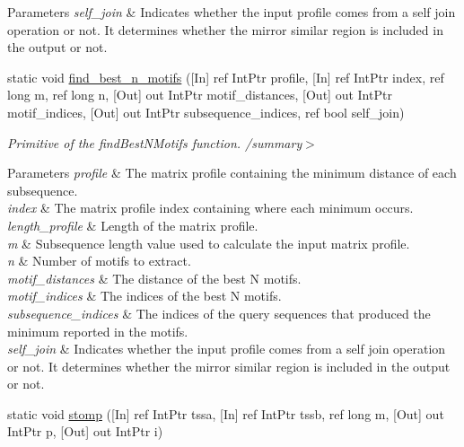 \begin{DoxyCompactItemize}
\begin{DoxyCompactList}
\begin{DoxyParams}{Parameters}
{\em self\+\_\+join} & Indicates whether the input profile comes from a self join operation or not. It determines whether the mirror similar region is included in the output or not.\\
\hline
\end{DoxyParams}
\end{DoxyCompactList}\item 
static void \mbox{\hyperlink{classkhiva_1_1interop_1_1_d_l_l_matrix_a6d7807c201a0b105ab3ab608b6e45a21}{find\+\_\+best\+\_\+n\+\_\+motifs}} (\mbox{[}In\mbox{]} ref Int\+Ptr profile, \mbox{[}In\mbox{]} ref Int\+Ptr index, ref long m, ref long n, \mbox{[}Out\mbox{]} out Int\+Ptr motif\+\_\+distances, \mbox{[}Out\mbox{]} out Int\+Ptr motif\+\_\+indices, \mbox{[}Out\mbox{]} out Int\+Ptr subsequence\+\_\+indices, ref bool self\+\_\+join)
\begin{DoxyCompactList}\small\item\em Primitive of the find\+Best\+N\+Motifs function. /summary$>$ 
\begin{DoxyParams}{Parameters}
{\em profile} & The matrix profile containing the minimum distance of each subsequence.\\
\hline
{\em index} & The matrix profile index containing where each minimum occurs.\\
\hline
{\em length\+\_\+profile} & Length of the matrix profile.\\
\hline
{\em m} & Subsequence length value used to calculate the input matrix profile.\\
\hline
{\em n} & Number of motifs to extract.\\
\hline
{\em motif\+\_\+distances} & The distance of the best N motifs.\\
\hline
{\em motif\+\_\+indices} & The indices of the best N motifs.\\
\hline
{\em subsequence\+\_\+indices} & The indices of the query sequences that produced the minimum reported in the motifs.\\
\hline
{\em self\+\_\+join} & Indicates whether the input profile comes from a self join operation or not. It determines whether the mirror similar region is included in the output or not.\\
\hline
\end{DoxyParams}
\end{DoxyCompactList}\item 
static void \mbox{\hyperlink{classkhiva_1_1interop_1_1_d_l_l_matrix_a8e4c34c4cbc1f5258d20525b5dd91112}{stomp}} (\mbox{[}In\mbox{]} ref Int\+Ptr tssa, \mbox{[}In\mbox{]} ref Int\+Ptr tssb, ref long m, \mbox{[}Out\mbox{]} out Int\+Ptr p, \mbox{[}Out\mbox{]} out Int\+Ptr i)

\end{DoxyCompactItemize}
